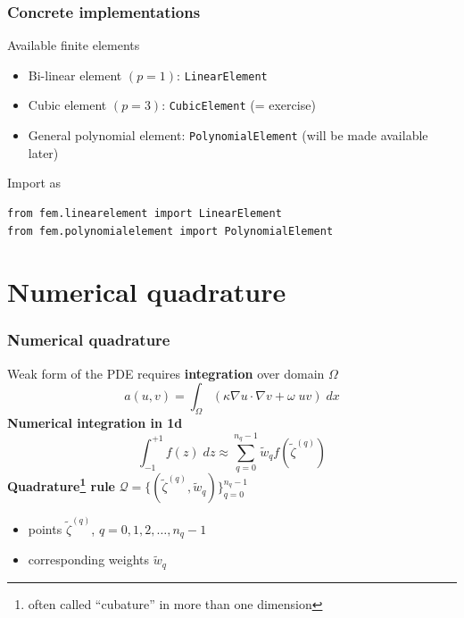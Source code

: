 \documentclass{beamer}
\begin{document}

\begin{frame}[fragile]
\frametitle{Concrete implementations}
Available finite elements
\begin{itemize}
\item Bi-linear element $(p=1)$: \lstinline{LinearElement}
\item Cubic element $(p=3)$: \lstinline{CubicElement} (= exercise)
\item General polynomial element: \lstinline{PolynomialElement} (will be made available later)
\end{itemize}
\vspace{2ex}
Import as
\begin{lstlisting}
from fem.linearelement import LinearElement
from fem.polynomialelement import PolynomialElement
\end{lstlisting}
\end{frame}


\section{Numerical quadrature}


\begin{frame}
  \tableofcontents[currentsection]
\end{frame}


\begin{frame}
\frametitle{Numerical quadrature}
Weak form of the PDE requires \textbf{integration} over domain $\Omega$
$$
a(u,v) = \int_\Omega \left(\kappa \nabla u \cdot \nabla  v + \omega\; u v\right)\;dx
$$
\textbf{Numerical integration in 1d}
$$
\int_{-1}^{+1} f(z)\;dz \approx \sum_{q=0}^{n_q-1} \widetilde{w}_q f(\widetilde{\zeta}^{(q)})
$$
\textbf{Quadrature\footnote{often called ``cubature'' in more than one dimension} rule} $\mathcal{Q}=\{(\widetilde{\zeta}^{(q)},\widetilde{w}_q)\}_{q=0}^{n_q-1}$
\begin{itemize}
\item points $\widetilde{\zeta}^{(q)}$, $q=0,1,2,\dots,n_q-1$
\item corresponding weights $\widetilde{w}_q$
\end{itemize}
\end{frame}
\end{document}
